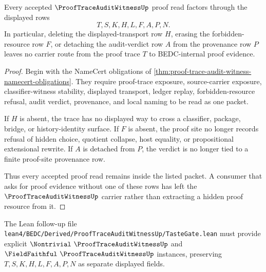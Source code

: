 \begin{theorem}
\label{thm:proof-trace-audit-witness-ledger-nonescape}
Every accepted $\ProofTraceAuditWitnessUp$ proof read factors through the displayed rows
$$
T,S,K,H,L,F,A,P,N.
$$
In particular, deleting the displayed-transport row $H$, erasing the forbidden-resource row $F$, or detaching the audit-verdict row $A$ from the provenance row $P$ leaves no carrier route from the proof trace $T$ to BEDC-internal proof evidence.
\end{theorem}
\begin{proof}
Begin with the NameCert obligations of \autoref{thm:proof-trace-audit-witness-namecert-obligations}. They require proof-trace exposure, source-carrier exposure, classifier-witness stability, displayed transport, ledger replay, forbidden-resource refusal, audit verdict, provenance, and local naming to be read as one packet.

If $H$ is absent, the trace has no displayed way to cross a classifier, package, bridge, or history-identity surface. If $F$ is absent, the proof site no longer records refusal of hidden choice, quotient collapse, host equality, or propositional extensional rewrite. If $A$ is detached from $P$, the verdict is no longer tied to a finite proof-site provenance row.

Thus every accepted proof read remains inside the listed packet. A consumer that asks for proof evidence without one of these rows has left the $\ProofTraceAuditWitnessUp$ carrier rather than extracting a hidden proof resource from it.
\end{proof}

The Lean follow-up file \texttt{lean4/BEDC/Derived/ProofTraceAuditWitnessUp/TasteGate.lean} must provide explicit $\Nontrivial\ \ProofTraceAuditWitnessUp$ and $\FieldFaithful\ \ProofTraceAuditWitnessUp$ instances, preserving $T,S,K,H,L,F,A,P,N$ as separate displayed fields.



